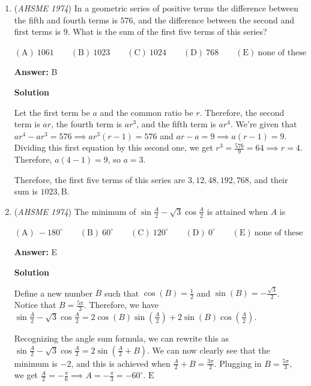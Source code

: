 \begin{enumerate}
 


	\item (\textit{AHSME 1974}) In a geometric series of positive terms the difference between the fifth and fourth terms is $576$, and the difference between the second and first terms is $9$. What is the sum of the first five terms of this series?


 $\mathrm{(A)\ } 1061 \qquad \mathrm{(B) \ }1023 \qquad \mathrm{(C) \  } 1024 \qquad \mathrm{(D) \  } 768 \qquad \mathrm{(E) \  }\text{none of these}$

 \textbf{Answer: }B



\textbf{Solution}

Let the first term be $a$ and the common ratio be $r$. Therefore, the second term is $ar$, the fourth term is $ar^3$, and the fifth term is $ar^4$. We're given that $ar^4-ar^3=576\implies ar^3(r-1)=576$ and $ar-a=9\implies a(r-1)=9$. Dividing this first equation by this second one, we get $r^3=\frac{576}{9}=64\implies r=4$. Therefore, $a(4-1)=9$, so $a=3$. 

 Therefore, the first five terms of this series are $3, 12, 48, 192, 768$, and their sum is $1023, \boxed{\text{B}}$.

 


	\item (\textit{AHSME 1974}) The minimum of $\sin\frac{A}{2}-\sqrt{3}\cos\frac{A}{2}$ is attained when $A$ is 


 $\mathrm{(A)\ } -180^\circ \qquad \mathrm{(B) \ }60^\circ \qquad \mathrm{(C) \  } 120^\circ \qquad \mathrm{(D) \  } 0^\circ \qquad \mathrm{(E) \  }\text{none of these}$

 \textbf{Answer: }E



\textbf{Solution}

Define a new number $B$ such that $\cos(B)=\frac{1}{2}$ and $\sin(B)=-\frac{\sqrt{3}}{2}$. Notice that $B=\frac{5\pi}{3}$. Therefore, we have $\sin\frac{A}{2}-\sqrt{3}\cos\frac{A}{2}= 2\cos(B)\sin\left(\frac{A}{2}\right)+2\sin(B)\cos\left(\frac{A}{2}\right)$. 

 Recognizing the angle sum formula, we can rewrite this as $\sin\frac{A}{2}-\sqrt{3}\cos\frac{A}{2}=2\sin\left(\frac{A}{2}+B\right)$. We can now clearly see that the minimum is $-2$, and this is achieved when $\frac{A}{2}+B=\frac{3\pi}{2}$. Plugging in $B=\frac{5\pi}{3}$, we get $\frac{A}{2}=-\frac{\pi}{6}\implies A=-\frac{\pi}{3}=-60^\circ$. $\boxed{\text{E}}$




\end{enumerate}
